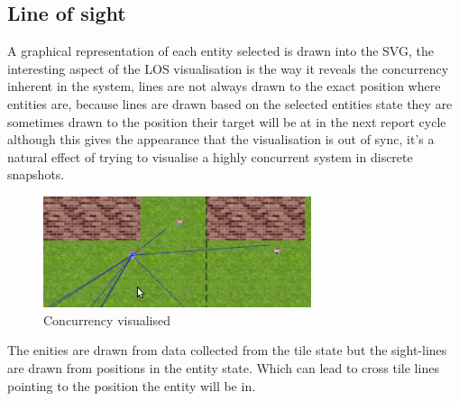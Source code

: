 \subsection{Line of sight}
A graphical representation of each entity selected is drawn into the SVG, the interesting aspect of the LOS visualisation is the way it reveals the concurrency inherent in the system, lines are not always drawn to the exact position where entities are, because lines are drawn based on the selected entities state they are sometimes drawn to the position their target will be at in the next report cycle although this gives the appearance that the visualisation is out of sync, it's a natural effect of trying to visualise a highly concurrent system in discrete snapshots.
\begin{figure}[f]
  \centering
  \includegraphics[width=0.7\textwidth]{img/concurrent-lag.png}
\caption{Concurrency visualised}
    \label{fig:Concurrency visualised}
\end{figure}

The enities are drawn from data collected from the tile state but the sight-lines are drawn from positions in the entity state. Which can lead to cross tile lines pointing to the position the entity will be in.
\clearpage
\endinput
